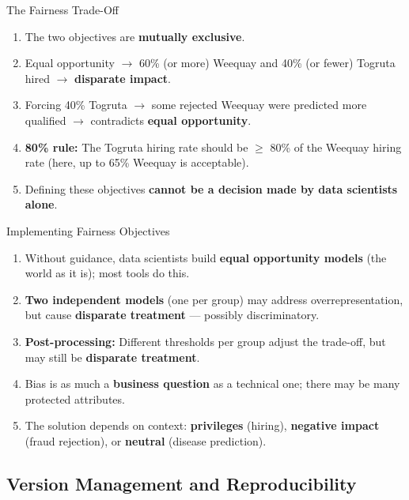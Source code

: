 \begin{frame}{The Fairness Trade-Off}
\begin{enumerate}
\item<1-> The two objectives are \textbf{mutually exclusive}.
\item<2-> Equal opportunity $\rightarrow$ 60\% (or more) Weequay and 40\% (or fewer) Togruta hired $\rightarrow$ \textbf{disparate impact}.
\item<3-> Forcing 40\% Togruta $\rightarrow$ some rejected Weequay were predicted more qualified $\rightarrow$ contradicts \textbf{equal opportunity}.
\item<4-> \textbf{80\% rule:} The Togruta hiring rate should be $\geq$ 80\% of the Weequay hiring rate (here, up to 65\% Weequay is acceptable).
\item<5-> Defining these objectives \textbf{cannot be a decision made by data scientists alone}.
\end{enumerate}
\end{frame}

\begin{frame}{Implementing Fairness Objectives}
\begin{enumerate}
\item<1-> Without guidance, data scientists build \textbf{equal opportunity models} (the world as it is); most tools do this.
\item<2-> \textbf{Two independent models} (one per group) may address overrepresentation, but cause \textbf{disparate treatment} --- possibly discriminatory.
\item<3-> \textbf{Post-processing:} Different thresholds per group adjust the trade-off, but may still be \textbf{disparate treatment}.
\item<4-> Bias is as much a \textbf{business question} as a technical one; there may be many protected attributes.
\item<5-> The solution depends on context: \textbf{privileges} (hiring), \textbf{negative impact} (fraud rejection), or \textbf{neutral} (disease prediction).
\end{enumerate}
\end{frame}

\subsection{Version Management and Reproducibility}

